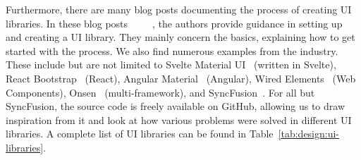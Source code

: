 Furthermore, there are many blog posts documenting the process of creating UI libraries. In these blog posts~~~~~, the authors provide guidance in setting up and creating a UI library. They mainly concern the basics, explaining how to get started with the process.
We also find numerous examples from the industry. These include but are not limited to Svelte Material UI~ (written in Svelte), React Bootstrap~ (React), Angular Material~ (Angular), Wired Elements~ (Web Components), Onsen~ (multi-framework), and SyncFusion~. For all but SyncFusion, the source code is freely available on GitHub, allowing us to draw inspiration from it and look at how various problems were solved in different UI libraries. A complete list of UI libraries can be found in Table~\ref{tab:design:ui-libraries}.

